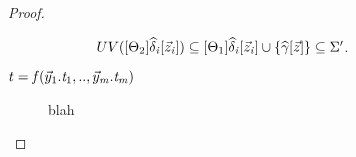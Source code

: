 \documentclass[a4,natbib=false]{article}
\begin{document}
\begin{proof}
\begin{description}
\begin{enumerate}
\begin{itemize}
          $UV([  \Theta_{{\mathrm{2}}}  ]  \widehat{\delta}_{\mathit{i}}  [  \vec{z}_{\mathit{i}}  ]) \subseteq [  \Theta_{{\mathrm{1}}}  ]  \widehat{\delta}_{\mathit{i}}  [  \vec{z}_{\mathit{i}}  ] \cup \{ \widehat{\gamma}  [  \vec{z}  ]\} \subseteq \Sigma'$. 
        \end{itemize}
    \end{enumerate}

  \item[$t = \mathit{f}  (  \vec{y}_{{\mathrm{1}}}  .  \mathit{t_{{\mathrm{1}}}}  ,..,  \vec{y}_{\mathit{m}}  .  \mathit{t_{\mathit{m}}}  )$] 
    blah

  \end{description}
  
\end{proof}
\end{document}
